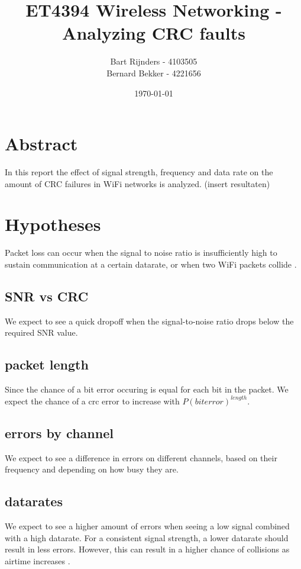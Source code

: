 \documentclass{IEEEtran}
\title{ET4394 Wireless Networking - Analyzing CRC faults}
\date{\today}
\author{
Bart Rijnders - 4103505 \\
Bernard Bekker - 4221656 
}
\begin{document}
\maketitle

\section{Abstract}

In this report the effect of signal strength, frequency and data rate on the amount of CRC failures in WiFi networks is analyzed. (insert resultaten)


\section{Hypotheses}

Packet loss can occur when the signal to noise ratio is insufficiently high to sustain communication at a certain datarate, or when two WiFi packets collide \cite{4509719}. 

\subsection{SNR vs CRC}
We expect to see a quick dropoff when the signal-to-noise ratio drops below the required SNR value.

\subsection{packet length}
Since the chance of a bit error occuring is equal for each bit in the packet. We expect the chance of a crc error to increase with $P(biterror)^{length}$. 

\subsection{errors by channel}
We expect to see a difference in errors on different channels, based on their frequency and depending on how busy they are.

\subsection{datarates}
We expect to see a higher amount of errors when seeing a low signal combined with a high datarate. For a consistent signal strength, a lower datarate should result in less errors. However, this can result in a higher chance of collisions as airtime increases \cite{4215626}. 
\end{document}
